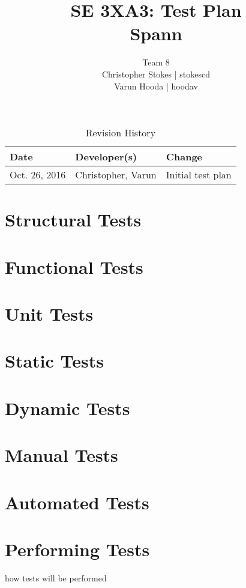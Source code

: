 \documentclass{article}
\title{SE 3XA3: Test Plan\\Spann}
\author{Team 8
		\\ Christopher Stokes | stokescd
		\\ Varun Hooda | hoodav
}
\date{}
\begin{document}
\begin{table}[hp]
\caption{Revision History} \label{TblRevisionHistory}
\begin{tabularx}{\textwidth}{llX}
\toprule
\textbf{Date} & \textbf{Developer(s)} & \textbf{Change}\\
\midrule
    Oct. 26, 2016 & Christopher, Varun & Initial test plan\\
\bottomrule
\end{tabularx}
\end{table}

\newpage

\maketitle

\section{Structural Tests}

\section{Functional Tests}

\section{Unit Tests}

\section{Static Tests}

\section{Dynamic Tests}

\section{Manual Tests}

\section{Automated Tests}

\section{Performing Tests}
how tests will be performed
\end{document}
